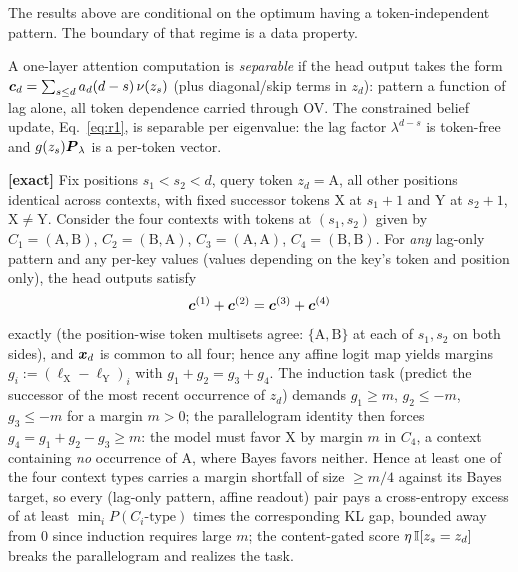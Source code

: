 \documentclass{article}
\begin{document}
The results above are conditional on the optimum having a token-independent pattern. The boundary of that regime is a data property.

\begin{definition}
A one-layer attention computation is \emph{separable} if the head output takes the form $\boldsymbol{c}_d = \sum_{s\le d} a_d(d-s)\,\nu(z_s)$ (plus diagonal/skip terms in $z_d$): pattern a function of lag alone, all token dependence carried through OV. The constrained belief update, Eq.~\eqref{eq:r1}, is separable per eigenvalue: the lag factor $\lambda^{d-s}$ is token-free and $g(z_s)\boldsymbol{P}_\lambda$ is a per-token vector.
\end{definition}

\begin{lemma}\label{lem:parallelogram}
\textbf{[exact]} Fix positions $s_1 < s_2 < d$, query token $z_d = \mathrm{A}$, all other positions identical across contexts, with fixed successor tokens $\mathrm{X}$ at $s_1{+}1$ and $\mathrm{Y}$ at $s_2{+}1$, $\mathrm{X} \ne \mathrm{Y}$. Consider the four contexts with tokens at $(s_1, s_2)$ given by $C_1 = (\mathrm{A}, \mathrm{B})$, $C_2 = (\mathrm{B}, \mathrm{A})$, $C_3 = (\mathrm{A}, \mathrm{A})$, $C_4 = (\mathrm{B}, \mathrm{B})$. For \emph{any} lag-only pattern and any per-key values (values depending on the key's token and position only), the head outputs satisfy
\begin{equation}
    \boldsymbol{c}^{(1)} + \boldsymbol{c}^{(2)} = \boldsymbol{c}^{(3)} + \boldsymbol{c}^{(4)}
\end{equation}
exactly (the position-wise token multisets agree: $\{\mathrm{A}, \mathrm{B}\}$ at each of $s_1, s_2$ on both sides), and $\boldsymbol{x}_d$ is common to all four; hence any affine logit map yields margins $g_i := (\ell_{\mathrm{X}} - \ell_{\mathrm{Y}})_i$ with $g_1 + g_2 = g_3 + g_4$. The induction task (predict the successor of the most recent occurrence of $z_d$) demands $g_1 \ge m$, $g_2 \le -m$, $g_3 \le -m$ for a margin $m > 0$; the parallelogram identity then forces $g_4 = g_1 + g_2 - g_3 \ge m$: the model must favor $\mathrm{X}$ by margin $m$ in $C_4$, a context containing \emph{no} occurrence of $\mathrm{A}$, where Bayes favors neither. Hence at least one of the four context types carries a margin shortfall of size $\ge m/4$ against its Bayes target, so every (lag-only pattern, affine readout) pair pays a cross-entropy excess of at least $\min_i P(C_i\text{-type})$ times the corresponding KL gap, bounded away from $0$ since induction requires large $m$; the content-gated score $\eta\,\mathbb{I}[z_s = z_d]$ breaks the parallelogram and realizes the task.
\end{lemma}
\end{document}
